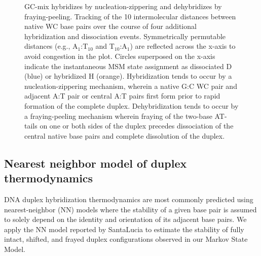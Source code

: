 \documentclass[journal=jpcbfk,manuscript=article]{achemso}
\begin{document}
\begin{figure}[ht!]
	\centering
    \caption{GC-mix hybridizes by nucleation-zippering and dehybridizes by fraying-peeling. Tracking of the 10 intermolecular distances between native WC base pairs over the course of four additional hybridization and dissociation events. Symmetrically permutable distances (e.g., A$_1$:T$_{10}$ and T$_{10}$:A$_1$) are reflected across the x-axis to avoid congestion in the plot. Circles superposed on the x-axis indicate the instantaneous MSM state assignment as dissociated D (blue) or hybridized H (orange). Hybridization tends to occur by a nucleation-zippering mechanism, wherein a native G:C WC pair and adjacent A:T pair or central A:T pairs first form prior to rapid formation of the complete duplex. Dehybridization tends to occur by a fraying-peeling mechanism wherein fraying of the two-base AT-tails on one or both sides of the duplex precedes dissociation of the central native base pairs and complete dissolution of the duplex.}
    \label{fig:SIFig5}
\end{figure}

\clearpage
\newpage

\subsection*{Nearest neighbor model of duplex thermodynamics}

DNA duplex hybridization thermodynamics are most commonly predicted using nearest-neighbor (NN) models where the stability of a given base pair is assumed to solely depend on the identity and orientation of its adjacent base pairs. We apply the NN model reported by SantaLucia\citep{SantaLucia1998AThermodynamics}  to estimate the stability of fully intact, shifted, and frayed duplex configurations observed in our Markov State Model. 
\end{document}
